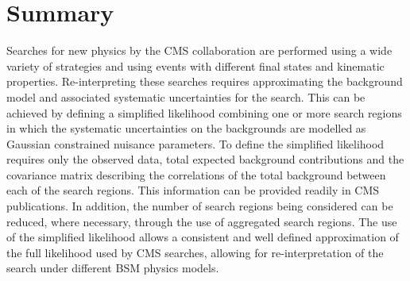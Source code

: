 \section{Summary}
\label{sec:conclusions}
Searches for new physics by the CMS collaboration are performed using a wide variety of 
strategies and using events with different final states and kinematic properties. 
Re-interpreting these searches requires approximating the background model
and associated systematic uncertainties for the search. This can be 
achieved by defining a simplified likelihood combining one or more search regions in which the systematic 
uncertainties on the backgrounds are modelled  as Gaussian  constrained nuisance parameters. 
To define the simplified likelihood requires only the observed data, total expected background contributions and 
the covariance matrix describing the correlations of the total background between each of the search regions. 
This information can be provided readily in CMS publications. In addition, the number of search regions being 
considered can be reduced, where necessary, through the use of aggregated search regions.  
The use of the simplified likelihood allows a consistent and well defined approximation of the 
full likelihood used by CMS searches, allowing for re-interpretation of the search under different BSM 
physics models.

